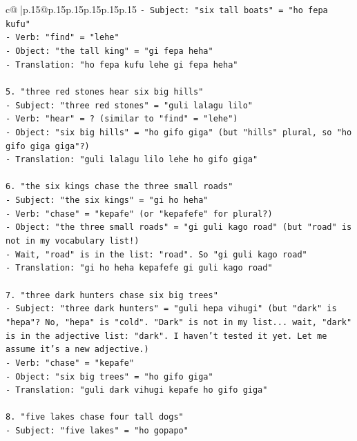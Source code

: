 \documentclass{article}
\begin{document}
{\begin{supertabular}{c@{$\;$}|p{.15\linewidth}@{}p{.15\linewidth}p{.15\linewidth}p{.15\linewidth}p{.15\linewidth}p{.15\linewidth}}
{{{\texttt{{-} Subject: "six tall boats" = "ho fepa kufu"} \\
\texttt{{-} Verb: "find" = "lehe"} \\
\texttt{{-} Object: "the tall king" = "gi fepa heha"} \\
\texttt{{-} Translation: "ho fepa kufu lehe gi fepa heha"} \\
\\ 
\texttt{5. "three red stones hear six big hills"} \\
\texttt{{-} Subject: "three red stones" = "guli lalagu lilo"} \\
\texttt{{-} Verb: "hear" = ? (similar to "find" = "lehe")} \\
\texttt{{-} Object: "six big hills" = "ho gifo giga" (but "hills" plural, so "ho gifo giga giga"?)} \\
\texttt{{-} Translation: "guli lalagu lilo lehe ho gifo giga"} \\
\\ 
\texttt{6. "the six kings chase the three small roads"} \\
\texttt{{-} Subject: "the six kings" = "gi ho heha"} \\
\texttt{{-} Verb: "chase" = "kepafe" (or "kepafefe" for plural?)} \\
\texttt{{-} Object: "the three small roads" = "gi guli kago road" (but "road" is not in my vocabulary list!)} \\
\texttt{{-} Wait, "road" is in the list: "road". So "gi guli kago road"} \\
\texttt{{-} Translation: "gi ho heha kepafefe gi guli kago road"} \\
\\ 
\texttt{7. "three dark hunters chase six big trees"} \\
\texttt{{-} Subject: "three dark hunters" = "guli hepa vihugi" (but "dark" is "hepa"? No, "hepa" is "cold". "Dark" is not in my list... wait, "dark" is in the adjective list: "dark". I haven't tested it yet. Let me assume it's a new adjective.)} \\
\texttt{{-} Verb: "chase" = "kepafe"} \\
\texttt{{-} Object: "six big trees" = "ho gifo giga"} \\
\texttt{{-} Translation: "guli dark vihugi kepafe ho gifo giga"} \\
\\ 
\texttt{8. "five lakes chase four tall dogs"} \\
\texttt{{-} Subject: "five lakes" = "ho gopapo"} \\
}}}
\end{supertabular}}
\end{document}
